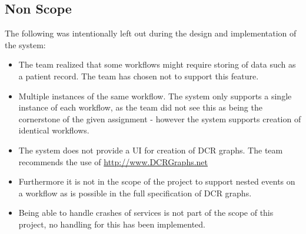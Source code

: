 \subsection{Non Scope}
The following was intentionally left out during the design and implementation of the system:

\begin{itemize}
\item The team realized that some workflows might require storing of data such as a patient record. The team has chosen not to support this feature. 
\item Multiple instances of the same workflow. The system only supports a single instance of each workflow, as the team did not see this as being the cornerstone of the given assignment - however the system supports creation of identical workflows. 
\item The system does not provide a UI for creation of DCR graphs. The team recommends the use of \url{http://www.DCRGraphs.net}
\item Furthermore it is not in the scope of the project to support nested events on a workflow as is possible in the full specification of  DCR graphs.
\item Being able to handle crashes of services is not part of the scope of this project, no handling for this has been implemented.
\end{itemize}